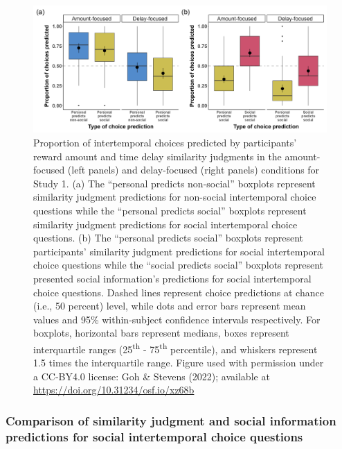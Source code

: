 \documentclass[
  pub,floatsintext]{apa6}
\begin{document}
\begin{figure}
\includegraphics[width=1\linewidth]{figures/sim_judgment_predictions_combined_1} \caption{Proportion of intertemporal choices predicted by participants' reward amount and time delay similarity judgments in the amount-focused (left panels) and delay-focused (right panels) conditions for Study 1. (a) The ``personal predicts non-social'' boxplots represent similarity judgment predictions for non-social intertemporal choice questions while the ``personal predicts social'' boxplots represent similarity judgment predictions for social intertemporal choice questions. (b) The ``personal predicts social'' boxplots represent participants' similarity judgment predictions for social intertemporal choice questions while the ``social predicts social'' boxplots represent presented social information's predictions for social intertemporal choice questions. Dashed lines represent choice predictions at chance (i.e., 50 percent) level, while dots and error bars represent mean values and 95\% within-subject confidence intervals respectively. For boxplots, horizontal bars represent medians, boxes represent interquartile ranges (25\textsuperscript{th} - 75\textsuperscript{th} percentile), and whiskers represent 1.5 times the interquartile range. Figure used with permission under a CC-BY4.0 license: Goh \& Stevens (2022); available at \url{https://doi.org/10.31234/osf.io/xz68b}}\label{fig:simjudgmentsocialinfopredictions1}
\end{figure}

\hypertarget{comparison-of-similarity-judgment-and-social-information-predictions-for-social-intertemporal-choice-questions}{%
\subsubsection{Comparison of similarity judgment and social information predictions for social intertemporal choice questions}\label{comparison-of-similarity-judgment-and-social-information-predictions-for-social-intertemporal-choice-questions}}
\end{document}
